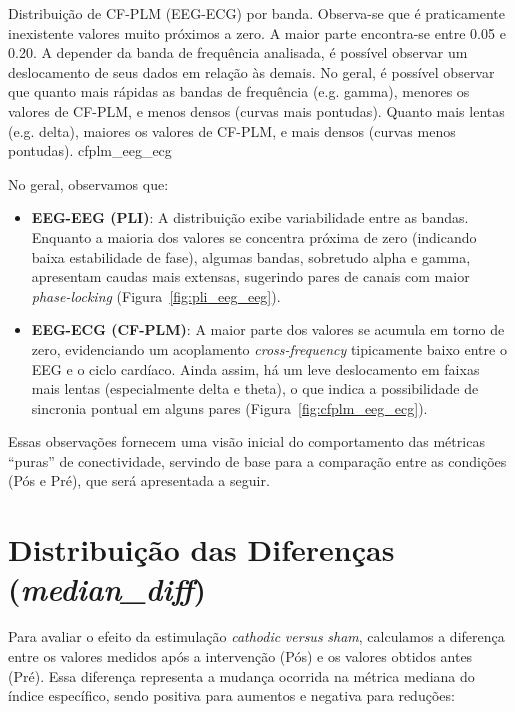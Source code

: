 {Distribuição de CF-PLM (EEG-ECG) por banda. Observa-se que é praticamente inexistente valores muito próximos a zero. A maior parte encontra-se entre 0.05 e 0.20. A depender da banda de frequência analisada, é possível observar um deslocamento de seus dados em relação às demais. No geral, é possível observar que quanto mais rápidas as bandas de frequência (e.g. gamma), menores os valores de CF-PLM, e menos densos (curvas mais pontudas). Quanto mais lentas (e.g. delta), maiores os valores de CF-PLM, e mais densos (curvas menos pontudas).}
{cfplm_eeg_ecg}

No geral, observamos que:
\begin{itemize}
    \item \textbf{EEG-EEG (PLI)}: A distribuição exibe variabilidade entre as bandas. Enquanto a maioria dos valores se concentra próxima de zero (indicando baixa estabilidade de fase), algumas bandas, sobretudo alpha e gamma, apresentam caudas mais extensas, sugerindo pares de canais com maior \emph{phase-locking} (Figura~\ref{fig:pli_eeg_eeg}).
    \item \textbf{EEG-ECG (CF-PLM)}: A maior parte dos valores se acumula em torno de zero, evidenciando um acoplamento \textit{cross-frequency} tipicamente baixo entre o EEG e o ciclo cardíaco. Ainda assim, há um leve deslocamento em faixas mais lentas (especialmente delta e theta), o que indica a possibilidade de sincronia pontual em alguns pares (Figura~\ref{fig:cfplm_eeg_ecg}).
\end{itemize}

Essas observações fornecem uma visão inicial do comportamento das métricas ``puras'' de conectividade, servindo de base para a comparação entre as condições (Pós e Pré), que será apresentada a seguir.

\section{Distribuição das Diferenças (\textit{median\_diff})}
Para avaliar o efeito da estimulação \textit{cathodic} \textit{versus} \textit{sham}, calculamos a diferença entre os valores medidos após a intervenção (Pós) e os valores obtidos antes (Pré). Essa diferença representa a mudança ocorrida na métrica mediana do índice específico, sendo positiva para aumentos e negativa para reduções:


